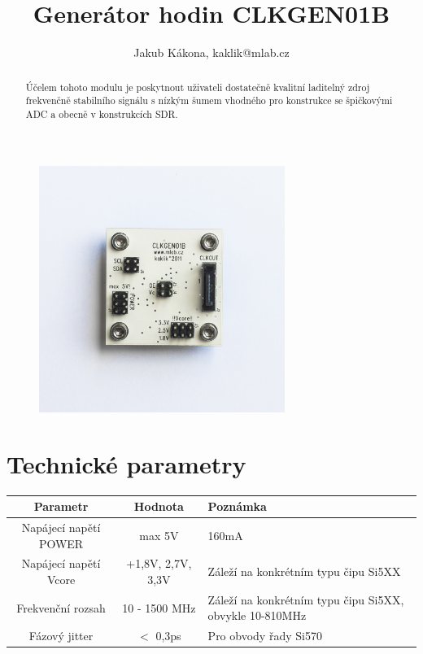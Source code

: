 \documentclass[12pt,a4paper,oneside]{article}
\begin{document}
\title{Generátor hodin CLKGEN01B}
\author{Jakub Kákona, kaklik@mlab.cz}
\maketitle

\thispagestyle{empty}
\begin{abstract}
Účelem tohoto modulu je poskytnout uživateli dostatečně kvalitní laditelný zdroj frekvenčně stabilního signálu s nízkým šumem vhodného pro konstrukce se špičkovými ADC a obecně v konstrukcích SDR.
\end{abstract}

\begin{figure} [htbp]
\begin{center}
\includegraphics [width=80mm] {./img/CLKGEN01B_Top_Big.jpg} 
\end{center}
\end{figure}

\tableofcontents

\section{Technické parametry}
\begin{table}[htbp]
\begin{center}
\begin{tabular}{|c|c|p{4.7cm}|}
\hline
Parametr & Hodnota & Poznámka \\
\hline
Napájecí napětí POWER  & max 5V &  160mA \\ 
\hline
Napájecí napětí Vcore & +1,8V, 2,7V, 3,3V &  Záleží na konkrétním typu čipu Si5XX \\ 
\hline
Frekvenční rozsah  & 10 - 1500 MHz & Záleží na konkrétním typu čipu Si5XX, obvykle 10-810MHz \\ 
\hline
Fázový jitter  & $<$ 0,3ps & Pro obvody řady Si570 \\ 
\hline
\end{tabular}
\end{center}
\end{table}
\end{document}
